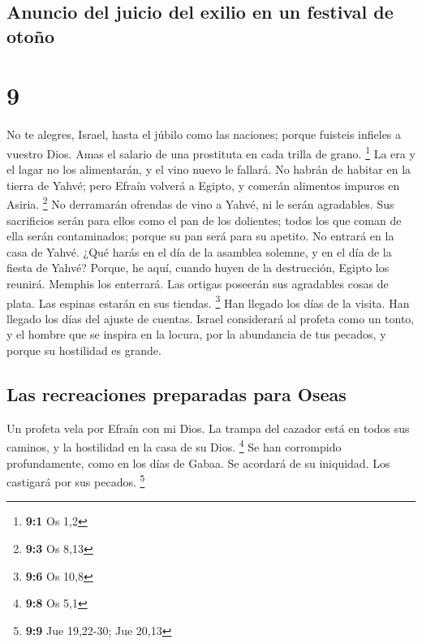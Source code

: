 \hypertarget{anuncio-del-juicio-del-exilio-en-un-festival-de-otouxf1o}{%
\subsection{Anuncio del juicio del exilio en un festival de
otoño}\label{anuncio-del-juicio-del-exilio-en-un-festival-de-otouxf1o}}

\hypertarget{section-8}{%
\section{9}\label{section-8}}

 No te alegres, Israel, hasta el júbilo como las naciones;
porque fuisteis infieles a vuestro Dios. Amas el salario de una
prostituta en cada trilla de grano. \footnote{\textbf{9:1} Os 1,2}
 La era y el lagar no los alimentarán, y el vino nuevo le
fallará.  No habrán de habitar en la tierra de Yahvé; pero
Efraín volverá a Egipto, y comerán alimentos impuros en Asiria.
\footnote{\textbf{9:3} Os 8,13}  No derramarán ofrendas de
vino a Yahvé, ni le serán agradables. Sus sacrificios serán para ellos
como el pan de los dolientes; todos los que coman de ella serán
contaminados; porque su pan será para su apetito. No entrará en la casa
de Yahvé.  ¿Qué harás en el día de la asamblea solemne, y
en el día de la fiesta de Yahvé?  Porque, he aquí, cuando
huyen de la destrucción, Egipto los reunirá. Memphis los enterrará. Las
ortigas poseerán sus agradables cosas de plata. Las espinas estarán en
sus tiendas. \footnote{\textbf{9:6} Os 10,8}  Han llegado
los días de la visita. Han llegado los días del ajuste de cuentas.
Israel considerará al profeta como un tonto, y el hombre que se inspira
en la locura, por la abundancia de tus pecados, y porque su hostilidad
es grande.

\hypertarget{las-recreaciones-preparadas-para-oseas}{%
\subsection{Las recreaciones preparadas para
Oseas}\label{las-recreaciones-preparadas-para-oseas}}

 Un profeta vela por Efraín con mi Dios. La trampa del
cazador está en todos sus caminos, y la hostilidad en la casa de su
Dios. \footnote{\textbf{9:8} Os 5,1}  Se han corrompido
profundamente, como en los días de Gabaa. Se acordará de su iniquidad.
Los castigará por sus pecados. \footnote{\textbf{9:9} Jue 19,22-30; Jue
  20,13}

